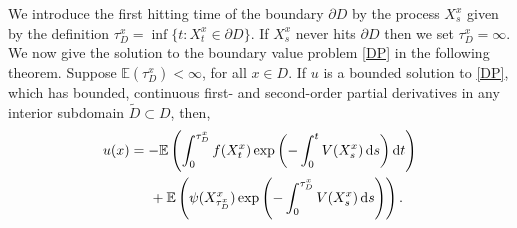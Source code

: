 \documentclass[a4paper,12pt,draft]{report}
\begin{document}
We introduce the first hitting time of the boundary $\partial D$ by the process $X_s^x$ given by the definition $\tau_D^x = \inf\{t : X_t^x \in \partial D\}$.  If $X_s^x$ never hits $\partial D$ then we set $\tau_D^x = \infty$.  We now give the solution to the boundary value problem \eqref{DP} in the following theorem.
\theorem
{
Suppose $\mathbb{E}(\tau_D^x) < \infty$, for all $x \in D$.  If $u$ is a bounded solution to \eqref{DP}, which has bounded, continuous first- and second-order partial derivatives in any interior subdomain $\tilde{D} \subset D$, then,
\begin{align}
u(x) & = -\mathbb{E}\left(\int_0^{\tau_D^x}f(X_t^x)\exp\left(-\int_0^tV(X_s^x)\,\mathrm{d}s\right)\mathrm{d}t\right)\nonumber\\
& \hspace{0.5cm} + \mathbb{E}\left(\psi(X_{\tau_D^x}^x)\exp\left(-\int_0^{\tau_D^x}V(X_s^x)\,\mathrm{d}s\right)\right). \label{DPFCF}
\end{align}
}
\proof
\end{document}
